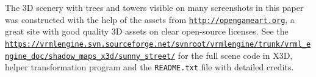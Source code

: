 \documentclass{acmsiggraph}                     %
\newcommand*{\myhref}[2]{\texttt{\href{#1}{\nolinkurl{#2}}}}
\begin{document}
The 3D scenery with trees and towers visible on many screenshots in this paper
was constructed with the help of the assets from \myhref{http://opengameart.org}{http://opengameart.org},
a great site with good quality 3D assets on clear open-source licenses.
See the \myhref{https://vrmlengine.svn.sourceforge.net/svnroot/vrmlengine/trunk/vrml\_engine\_doc/shadow\_maps\_x3d/sunny\_street/}{https://vrmlengine.svn.sourceforge.net/svnroot/vrmlengine/trunk/vrml_engine_doc/shadow_maps_x3d/sunny_street/}
for the full scene code in X3D, helper transformation program and the
\texttt{README.txt} file with detailed credits.



\nocite{*}

\end{document}
